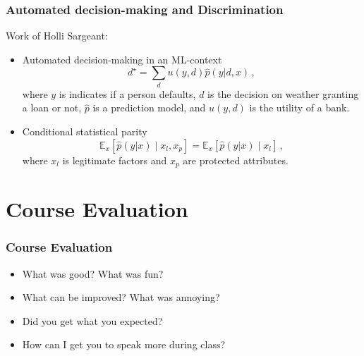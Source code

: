 \documentclass[10pt]{beamer}
\begin{document}
\begin{frame}
\frametitle{Automated decision-making and Discrimination}

Work of Holli Sargeant:

\begin{itemize}
\item Automated decision-making in an ML-context
\[
d^\star = \sum_d u(y,d) \hat{p}(y|d,x)\,,
\]
where $y$ is indicates if a person defaults, $d$ is the decision on weather granting a loan or not, $\hat{p}$ is a prediction model, and $u(y,d)$ is the utility of a bank.
\pause
\item Conditional statistical parity
\[
\mathbb{E}_x\left[\hat{p}(y|x) \mid x_l, x_p\right] = \mathbb{E}_x\left[\hat{p}(y|x)\mid x_l\right]\,,
\label{eq_cond_stat_parity}
\]
where $x_l$ is legitimate factors and $x_p$ are protected attributes.
\end{itemize}

\end{frame}


\section{Course Evaluation}
\frame{\sectionpage}

\begin{frame}

\frametitle{Course Evaluation}

\begin{itemize}
\item What was good? What was fun?
\pause
\item What can be improved? What was annoying?
\pause
\item Did you get what you expected?
\pause
\item How can I get you to speak more during class?
\end{itemize}

\end{frame}


\end{document}

